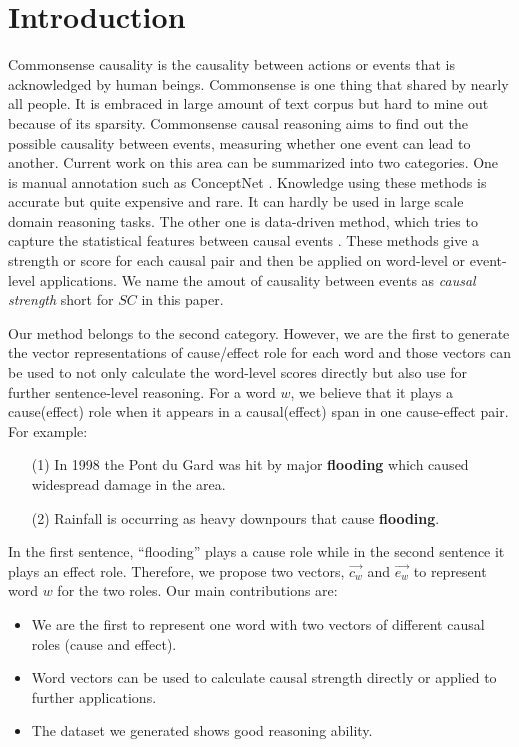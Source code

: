 \section{Introduction}
\label{sec:intro}
Commonsense causality is the causality between actions or events that is acknowledged by human beings. Commonsense is one thing that shared by nearly all people. It is embraced in large amount of text corpus but hard to mine out because of its sparsity. Commonsense causal reasoning aims to find out the possible causality between events, measuring whether one event can lead to another.
Current work on this area can be summarized into two categories. One is manual annotation such as ConceptNet \cite{singh2002open}. Knowledge using these methods is accurate but quite expensive and rare. It can hardly be used in large scale domain reasoning tasks. The other one is data-driven method, which tries to capture the statistical features between causal events \cite{luo2016commonsense}. These methods give a strength or score for each causal pair and then be applied on word-level or event-level applications. We name the amout of causality between events as \emph{causal strength} short for $SC$ in this paper.

Our method belongs to the second category. However, we are the first to generate the vector representations of cause/effect role for each word and those vectors can be used to not only calculate the word-level scores directly but also use for further sentence-level reasoning. For a word $w$, we believe that it plays a cause(effect) role when it appears in a causal(effect) span in one cause-effect pair. 
For example:
\begin{example}
\noindent
\label{eg:sen}
\begin{itemize}
	\item[(1)] In 1998 the Pont du Gard was hit by major \textbf{flooding} which caused widespread damage in the area.
	\item[(2)] Rainfall is occurring as heavy downpours that cause \textbf{flooding}.
\end{itemize}
\end{example}
In the first sentence, ``flooding'' plays a cause role while in the second sentence it plays an effect role. Therefore, we propose two vectors, $\overrightarrow{c_w}$ and $\overrightarrow{e_w}$ to represent word $w$ for the two roles.
Our main contributions are:
\begin{itemize}
	\item We are the first to represent one word with two vectors of different causal roles (cause and effect).
	\item Word vectors can be used to calculate causal strength directly or applied to further applications.
	\item The dataset we generated shows good reasoning ability.
\end{itemize}